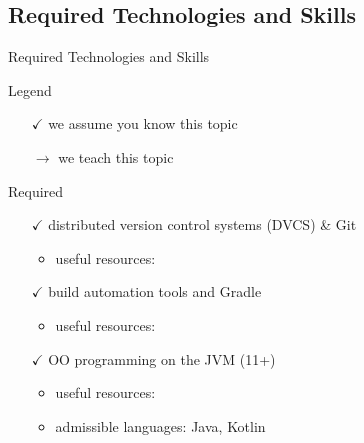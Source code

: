 \documentclass[presentation]{beamer}\mode<presentation>{\usetheme{AMSBolognaFC}}
\begin{document}
\subsection{Required Technologies and Skills}

\begin{frame}[c,allowframebreaks]{Required Technologies and Skills}

\begin{block}{Legend}
	\begin{multicols}{2}
		\begin{itemize}
			\item[$\checkmark$] we assume you know this topic
			\item[$\rightarrow$] we teach this topic
		\end{itemize}
	\end{multicols}
\end{block}

\framebreak

\begin{alertblock}{Required}
	\begin{itemize}
		\item[$\checkmark$] distributed version control systems (DVCS) \& \alert{Git}
		\begin{itemize}
			\item useful resources: 
		\end{itemize}

		\vfill

		\item[$\checkmark$] build automation tools and \alert{Gradle}
		\begin{itemize}
			\item useful resources: 
		\end{itemize}

		\vfill

		\item[$\checkmark$] OO programming on the JVM (11+)
		\begin{itemize}
			\item useful resources:  %
			\item admissible languages: Java, \alert{Kotlin}
		\end{itemize}

		\vfill


\end{itemize}
\end{alertblock}
\end{frame}
\end{document}
